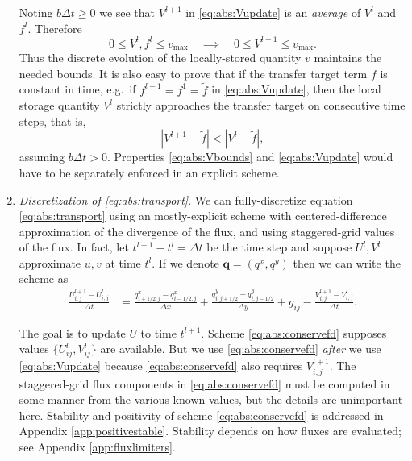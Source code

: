 \documentclass[11pt,final]{amsart}
\newcommand\bq{\mathbf{q}}
\begin{document}
\begin{enumerate}
Noting $b \Delta t \ge 0$ we see that $V^{l+1}$ in \eqref{eq:abs:Vupdate} is an \emph{average} of $V^l$ and $f^l$.  Therefore
\begin{equation}
0 \le V^l, f^l \le v_{\text{max}} \quad \implies \quad 0 \le V^{l+1} \le v_{\text{max}}. \label{eq:abs:Vbounds}
\end{equation}
Thus the discrete evolution of the locally-stored quantity $v$ maintains the needed bounds.  It is also easy to prove that if the transfer target term $f$ is constant in time, e.g.~if $f^{l-1}=f^1=\tilde f$ in \eqref{eq:abs:Vupdate}, then the local storage quantity $V^l$ strictly approaches the transfer target on consecutive time steps, that is,
\begin{equation}
\left|V^{l+1} - \tilde f\right| < \left|V^l - \tilde f\right|, \label{eq:abs:Vapproach}
\end{equation}
assuming $b\Delta t > 0$.  Properties \eqref{eq:abs:Vbounds} and \eqref{eq:abs:Vupdate} would have to be separately enforced in an explicit scheme.
\medskip

\item \emph{Discretization of \eqref{eq:abs:transport}}.  We can fully-discretize equation \eqref{eq:abs:transport} using an mostly-explicit scheme with centered-difference approximation of the divergence of the flux, and using staggered-grid values of the flux.  In fact, let $t^{l+1}-t^l = \Delta t$ be the time step and suppose $U^l,V^l$ approximate $u,v$ at time $t^l$.  If we denote $\bq = (q^x,q^y)$ then we can write the scheme as
\begin{align}
\frac{U_{i,j}^{l+1} - U_{i,j}^l}{\Delta t} &= \frac{q^x_{i+1/2,j} - q^x_{i-1/2,j}}{\Delta x} + \frac{q^y_{i,j+1/2} - q^y_{i,j-1/2}}{\Delta y} + g_{ij} - \frac{V_{i,j}^{l+1} - V_{i,j}^l}{\Delta t}. \label{eq:abs:conservefd}
\end{align}

The goal is to update $U$ to time $t^{l+1}$.  Scheme \eqref{eq:abs:conservefd} supposes values $\{U_{ij}^l,V_{ij}^l\}$ are available.  But we use \eqref{eq:abs:conservefd} \emph{after} we use \eqref{eq:abs:Vupdate} because \eqref{eq:abs:conservefd} also requires $ V_{i,j}^{l+1}$.  The staggered-grid flux components in \eqref{eq:abs:conservefd} must be computed in some manner from the various known values, but the details are unimportant here.  Stability and positivity of scheme \eqref{eq:abs:conservefd} is addressed in Appendix \ref{app:positivestable}.  Stability depends on how fluxes are evaluated; see Appendix \ref{app:fluxlimiters}.
\medskip


\end{enumerate}
\end{document}
